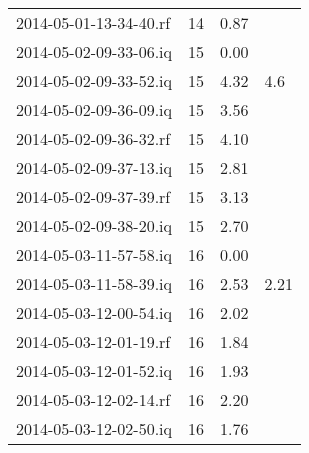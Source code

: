 \begin{center}
\begin{longtable}{@{}l p{1cm} p{3cm} p{3cm} @{}}
		2014-05-01-13-34-40.rf & 14 & 0.87 &  \\ 
		2014-05-02-09-33-06.iq & 15 & 0.00 &  \\ 
		2014-05-02-09-33-52.iq & 15 & 4.32 & 4.6 \\ 
		2014-05-02-09-36-09.iq & 15 & 3.56 &  \\ 
		2014-05-02-09-36-32.rf & 15 & 4.10 &  \\ 
		2014-05-02-09-37-13.iq & 15 & 2.81 &  \\ 
		2014-05-02-09-37-39.rf & 15 & 3.13 &  \\ 
		2014-05-02-09-38-20.iq & 15 & 2.70 &  \\ 
		2014-05-03-11-57-58.iq & 16 & 0.00 &  \\ 
		2014-05-03-11-58-39.iq & 16 & 2.53 & 2.21 \\ 
		2014-05-03-12-00-54.iq & 16 & 2.02 &  \\ 
		2014-05-03-12-01-19.rf & 16 & 1.84 &  \\ 
		2014-05-03-12-01-52.iq & 16 & 1.93 &  \\ 
		2014-05-03-12-02-14.rf & 16 & 2.20 &  \\ 
		2014-05-03-12-02-50.iq & 16 & 1.76 &  \\ 
		
	\end{longtable}
\end{center}



%
\clearpage